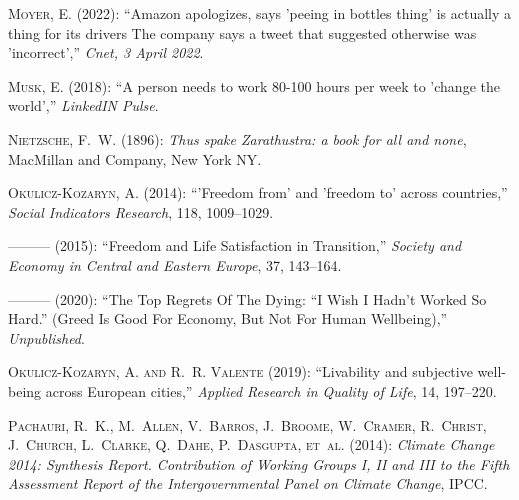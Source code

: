 \documentclass[10pt, letterpaper]{article}
\begin{document}
\begin{spacing}{2}
\begin{thebibliography}{120}
\textsc{Moyer, E.} (2022): \enquote{Amazon apologizes, says 'peeing in bottles
  thing' is actually a thing for its drivers The company says a tweet that
  suggested otherwise was 'incorrect',} \emph{Cnet, 3 April 2022}.

\textsc{Musk, E.} (2018): \enquote{A person needs to work 80-100 hours per week
  to 'change the world',} \emph{LinkedIN Pulse}.

\textsc{Nietzsche, F.~W.} (1896): \emph{Thus spake Zarathustra: a book for all
  and none}, MacMillan and Company, New York NY.

\textsc{Okulicz-Kozaryn, A.} (2014): \enquote{'Freedom from' and 'freedom to'
  across countries,} \emph{Social Indicators Research}, 118, 1009--1029.

---\hspace{-.1pt}---\hspace{-.1pt}--- (2015): \enquote{Freedom and Life
  Satisfaction in Transition,} \emph{Society and Economy in Central and Eastern
  Europe}, 37, 143--164.

---\hspace{-.1pt}---\hspace{-.1pt}--- (2020): \enquote{The Top Regrets Of The
  Dying: ``I Wish I Hadn't Worked So Hard.'' (Greed Is Good For Economy, But
  Not For Human Wellbeing),} \emph{Unpublished}.

\textsc{Okulicz-Kozaryn, A. and R.~R. Valente} (2019): \enquote{Livability and
  subjective well-being across European cities,} \emph{Applied Research in
  Quality of Life}, 14, 197--220.

\textsc{Pachauri, R.~K., M.~Allen, V.~Barros, J.~Broome, W.~Cramer, R.~Christ,
  J.~Church, L.~Clarke, Q.~Dahe, P.~Dasgupta, et~al.} (2014): \emph{Climate
  Change 2014: Synthesis Report. Contribution of Working Groups I, II and III
  to the Fifth Assessment Report of the Intergovernmental Panel on Climate
  Change}, IPCC.


\end{thebibliography}
\end{spacing}
\end{document}
